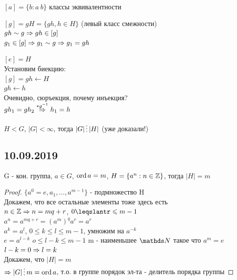 \documentclass[12pt, fleqn]{article}
\begin{document}
\begin{definition}
    $[a] = \{b:a ~ b\}$ классы эквивалентности
\end{definition}

\begin{definition}
    $[g] = g H = \{g h, h \in H \}$ (левый класс смежности)
    \\
    $g h \sim g \Rightarrow g h \in [g]$
    \\
    $g_1 \in [g] \Rightarrow g_1 \sim g \Rightarrow g_1 = g h$
\end{definition}

\begin{utv}
    $[e]=H$
    \\
    Установим биекцию:
    \\
    $[g]=g h \leftarrow H$
    \\
    $g h \leftarrow h$
    \\
    Очевидно, сюръекция, почему инъекция?
    \\
    $g h_1 = g h_2 \overset{*g^{-1}}{\Rightarrow} h_1 = h$
\end{utv}

\begin{theorem}[Лагранжа]
$H < G$, $|G| < \infty$, тогда $|G| \devides |H|$ (уже доказали!)
\end{theorem}
\subsection{10.09.2019}

\begin{consequence}
    G - кон. группа, $a \in G$, $\mathop{\rm ord}\nolimits a = m$, $H=\{a^n:n \in \mathbb{Z}\}$, тогда $|H|=m$\\
\end{consequence}

\begin{proof}
    $\{a^0=e,a_1,...,a^{m-1}\}$ - подмножество H\\
    Докажем, что все остальные элементы тоже здесь есть\\
    $n \in \mathbb{Z} \Rightarrow n=m q+r$, $0 \leqslantr \leqslant m-1$\\
    $a^n=a^{m q+r}=(a^m)^q a^r=a^r$\\
    $a^k=a^l$, $0 \leqslant k \leqslant l \leqslant m-1$, умножим на $a^{-k}$\\
    $e=a^{l-k}$ $o \leqslant l-k \leqslant m-1$ m - наименьшее $\N$ такое что $a^m=e$\\
    $l-k=0 \Rightarrow l=k$\\
    Докажем, что $|H|=m$\\
    $\Ra |G| \devides m=\ord a$, т.о. в группе порядок эл-та - делитель порядка группы
\end{proof}
\end{document}
